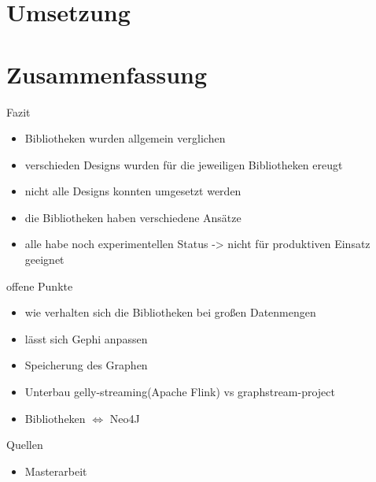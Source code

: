 \documentclass[a4paper, fontsize=11pt]{beamer}
\begin{document}
\section{Umsetzung}

\section{Zusammenfassung}
\begin{frame}{Fazit}
    \begin{itemize}
        \item Bibliotheken wurden allgemein verglichen
        \item verschieden Designs wurden für die jeweiligen Bibliotheken ereugt
        \item nicht alle Designs konnten umgesetzt werden
        \item die Bibliotheken haben verschiedene Ansätze
        \item alle habe noch experimentellen Status -> nicht für produktiven
            Einsatz geeignet
    \end{itemize}
\end{frame}

\begin{frame}{offene Punkte}
    \begin{itemize}
        \item wie verhalten sich die Bibliotheken bei großen Datenmengen
        \item lässt sich Gephi anpassen
        \item Speicherung des Graphen
        \item Unterbau gelly-streaming(Apache Flink) vs graphstream-project
        \item Bibliotheken $\Leftrightarrow$ Neo4J
    \end{itemize}
\end{frame}

\begin{frame}{Quellen}
    \begin{itemize}
        \item Masterarbeit
    \end{itemize}
\end{frame}
\end{document}
